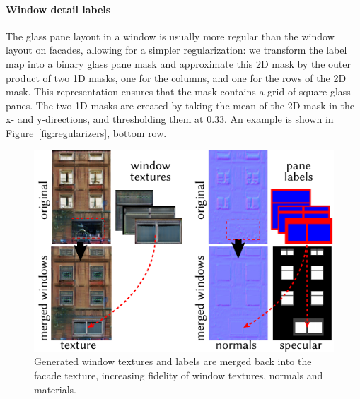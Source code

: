 \paragraph{Window detail labels}
The glass pane layout in a window is usually more regular than the window layout on facades, allowing for a simpler regularization: we transform the label map into a binary glass pane mask and approximate this 2D mask by the outer product of two 1D masks, one for the columns, and one for the rows of the 2D mask. This representation ensures that the mask contains a grid of square glass panes. The two 1D masks are created by taking the mean of the 2D mask in the x- and y-directions, and thresholding them at $0.33$. An example is shown in Figure~\ref{fig:regularizers}, bottom row.

\begin{figure}[t!]
    \centering
    \includegraphics[width=\columnwidth]{images/merge_maps.pdf}
    \caption{Generated window textures and labels are merged back into the facade texture, increasing fidelity of window textures, normals and materials.}
    \label{fig:merge_maps}
\end{figure}


